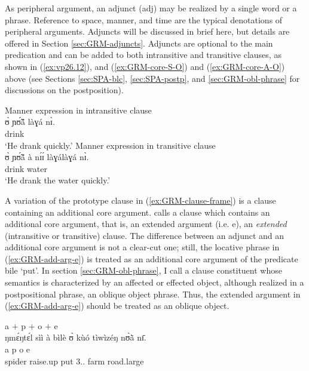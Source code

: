 As peripheral argument,  an  adjunct  ({\sc adj}) may be realized by a single 
word or a phrase. Reference to space, manner, and time are the typical  
denotations of peripheral arguments.  Adjuncts will be discussed in brief here, 
but details are offered in Section \ref{sec:GRM-adjuncts}.  Adjuncts are 
optional to the main predication and can be added to both intransitive and 
transitive clauses, as shown in  (\ref{ex:vp26.12}), and (\ref{ex:GRM-core-S-O}) 
and (\ref{ex:GRM-core-A-O}) above (see Sections \ref{sec:SPA-blc}, 
\ref{sec:SPA-postp},  and \ref{sec:GRM-obl-phrase} for  discussions on the 
postposition).

\ea

\ea\label{ex:vp26.12}{\rm Manner expression  in intransitive clause}\\
\gll ʊ̀ ɲʊ̃́ã́ làɣá nɪ̀.\\
   {\psg} drink {\ideo} {\postp}\\
\glt  `He drank quickly.' 
% 
\ex\label{ex:vp26.13.}{\rm  Manner expression in transitive clause}\\
\gll ʊ̀ ɲʊ̃́ã́ à nɪ́ɪ́  làɣálàɣá nɪ̀.\\
   {\psg} drink {\art} water  {\ideo} {\postp}\\
\glt  `He drank the water quickly.' 

\z 
 \z



A variation of the prototype  clause in (\ref{ex:GRM-clause-frame}) is a
clause containing an additional core argument.  \citet[116]{Dixo10b} calls  a
clause which contains an
additional core argument, that is,  an extended argument (i.e. {\sc e}), an
{\it extended} (intransitive or transitive) clause. The
difference between an adjunct and an additional core argument is not a clear-cut
one;   still,   the locative phrase in (\ref{ex:GRM-add-arg-e}) is treated as
  an additional core argument of the predicate {\sls bile} `put'. In section
\ref{sec:GRM-obl-phrase}, I call a clause constituent whose semantics is
characterized by an  affected or effected object, although realized in a
postpositional phrase, an oblique object phrase. Thus, the extended argument
in (\ref{ex:GRM-add-arg-e}) should be treated as an oblique object. 


\ea\label{ex:GRM-add-arg-e}{{\sc a} $+$ {\sc p}  $+$  {\sc o} $+$   {\sc e}}\\
\glll ŋmɛ́ŋtɛ́l {sìì à bìlè}  {ʊ̀  kùó}  {tìwìzéŋ nʊ̀ã̀  
nɪ̄}.\\
{\sc a} {\sc p}   {\sc o}   {\sc e}\\
spider {raise.up   {\conn} put} {{3.\sg.\poss}   farm } 
{road.large  {\reln}  {\postp}}\\


